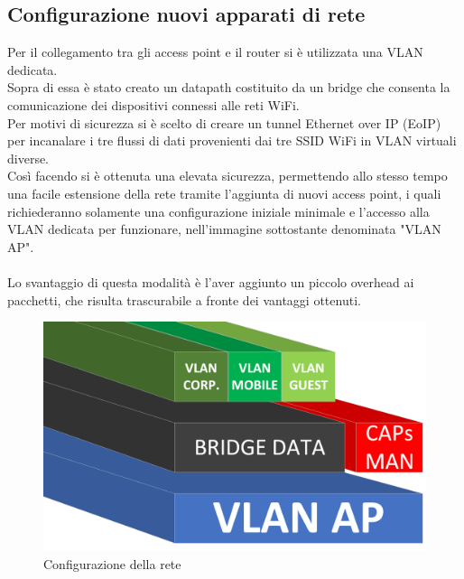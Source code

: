 \documentclass[Realizzazione.tex]{subfiles}
\begin{document}
\newpage
\subsection{Configurazione nuovi apparati di rete}
Per il collegamento tra gli access point e il router si è utilizzata una VLAN dedicata. \\
Sopra di essa è stato creato un datapath costituito da un bridge che consenta la comunicazione dei dispositivi connessi alle reti WiFi. \\
Per motivi di sicurezza si è scelto di creare un tunnel Ethernet over IP (EoIP) per incanalare i tre flussi di dati provenienti dai tre SSID WiFi in VLAN virtuali diverse. \\
Così facendo si è ottenuta una elevata sicurezza, permettendo allo stesso tempo una facile estensione della rete tramite l'aggiunta di nuovi access point, i quali richiederanno solamente una configurazione iniziale minimale e l'accesso alla VLAN dedicata per funzionare, nell'immagine sottostante denominata "VLAN AP". \\\\
Lo svantaggio di questa modalità è l'aver aggiunto un piccolo overhead ai pacchetti, che risulta trascurabile a fronte dei vantaggi ottenuti.

\begin{figure}[H]
	\centering
	\includegraphics[width=0.6\linewidth]{"images/VLAN"}
	\caption{Configurazione della rete}
	\label{fig:Configurazione della rete}
\end{figure}
\end{document}
